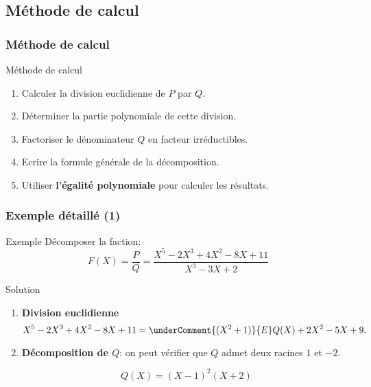 \documentclass{beamer}
\begin{document}
\subsection{Méthode de calcul}
\begin{frame}[<+->]
  \frametitle{Méthode de calcul}
 \begin{block}{Méthode de calcul}
   \begin{enumerate}
     \small
     \item Calculer la division euclidienne de $P$ par $Q$.\\[4pt]
     \item Déterminer la partie polynomiale de cette division.\\[4pt]
     \item Factoriser le dénominateur $Q$ en facteur irréductibles.\\[4pt]
     \item Ecrire la formule générale de la décomposition.\\[4pt]
     \item Utiliser \textbf{l'égalité polynomiale}  pour calculer les résultats.
   \end{enumerate}
 \end{block} 
\end{frame}
\begin{frame}[t]
  \frametitle{Exemple détaillé (1)}
 \begin{block}{Exemple}
  \small 
   Décomposer la faction:
   \begin{equation}
     F(X) =\dfrac{P}{Q}= \dfrac{X^5 - 2X^3 +4X^2 - 8X +11}{X^3 - 3X + 2}
   \end{equation}
 \end{block} 
\pause

\begin{block}{Solution}
  \begin{enumerate}
    \small
  \item \textbf{\alert{Division euclidienne}} 
    \begin{equation}
      X^5 - 2X^3 + 4X^2 -8X + 11 = \underComment{(X^2+1)}{ {E} } Q(X) + 2X^2 - 5X + 9.
    \end{equation}
    \pause
  \item \textbf{\alert{Décomposition de $Q$}}: on peut vérifier que $Q$ admet
    deux racines $1$ et $-2$.

    \begin{equation}
      Q(X) = (X-1)^2(X+2)
    \end{equation}
  \end{enumerate}
\end{block}
\end{frame}
\end{document}
